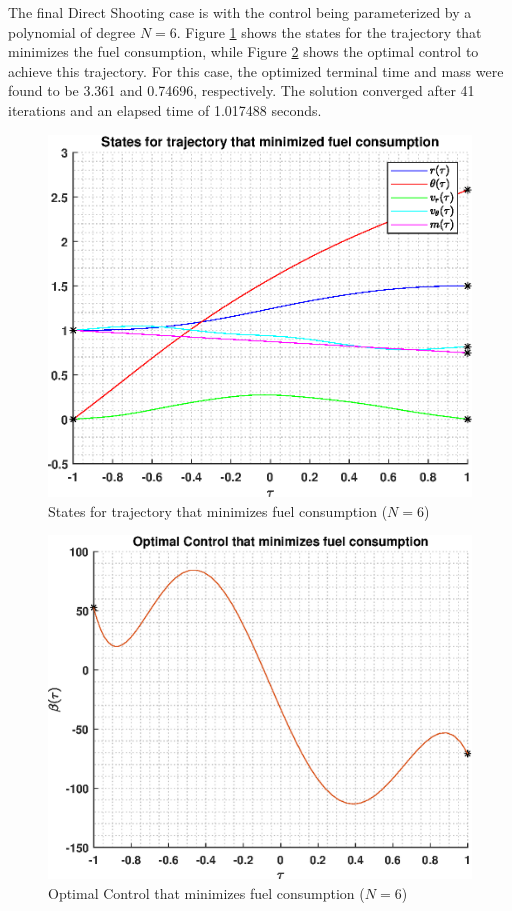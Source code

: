 \documentclass[]{article}
\begin{document}
The final Direct Shooting case is with the control being parameterized by a polynomial of degree \(N = 6\). Figure \ref{fig:directStatesPoly6} shows the states for the trajectory that minimizes the fuel consumption, while Figure \ref{fig:directControlPoly6} shows the optimal control to achieve this trajectory. For this case, the optimized terminal time and mass were found to be 3.361 and 0.74696, respectively. The solution converged after 41 iterations and an elapsed time of 1.017488 seconds.
\begin{figure}
	\centering
	\includegraphics[scale=0.75]{directStatesPoly6.eps}
	\caption{States for trajectory that minimizes fuel consumption (\(N = 6\))}
	\label{fig:directStatesPoly6}
\end{figure}
\begin{figure}
	\centering
	\includegraphics[scale=0.75]{directControlPoly6.eps}
	\caption{Optimal Control that minimizes fuel consumption (\(N = 6\))}
	\label{fig:directControlPoly6}
\end{figure}
\FloatBarrier
\end{document}
